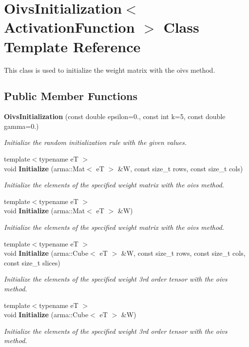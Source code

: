 \section{Oivs\+Initialization$<$ Activation\+Function $>$ Class Template Reference}
\label{classmlpack_1_1ann_1_1OivsInitialization}


This class is used to initialize the weight matrix with the oivs method.  


\subsection*{Public Member Functions}
\begin{DoxyCompactItemize}
\item 
\textbf{ Oivs\+Initialization} (const double epsilon=0., const int k=5, const double gamma=0.)
\begin{DoxyCompactList}\small\item\em Initialize the random initialization rule with the given values. \end{DoxyCompactList}\item 
{\footnotesize template$<$typename eT $>$ }\\void \textbf{ Initialize} (arma\+::\+Mat$<$ eT $>$ \&W, const size\+\_\+t rows, const size\+\_\+t cols)
\begin{DoxyCompactList}\small\item\em Initialize the elements of the specified weight matrix with the oivs method. \end{DoxyCompactList}\item 
{\footnotesize template$<$typename eT $>$ }\\void \textbf{ Initialize} (arma\+::\+Mat$<$ eT $>$ \&W)
\begin{DoxyCompactList}\small\item\em Initialize the elements of the specified weight matrix with the oivs method. \end{DoxyCompactList}\item 
{\footnotesize template$<$typename eT $>$ }\\void \textbf{ Initialize} (arma\+::\+Cube$<$ eT $>$ \&W, const size\+\_\+t rows, const size\+\_\+t cols, const size\+\_\+t slices)
\begin{DoxyCompactList}\small\item\em Initialize the elements of the specified weight 3rd order tensor with the oivs method. \end{DoxyCompactList}\item 
{\footnotesize template$<$typename eT $>$ }\\void \textbf{ Initialize} (arma\+::\+Cube$<$ eT $>$ \&W)
\begin{DoxyCompactList}\small\item\em Initialize the elements of the specified weight 3rd order tensor with the oivs method. \end{DoxyCompactList}\end{DoxyCompactItemize}


